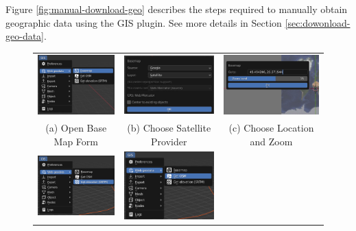 \newpage

Figure \ref{fig:manual-download-geo} describes the steps required to manually obtain geographic data using the GIS plugin. See more details in Section \ref{sec:dowonload-geo-data}.


\begin{figure}[H]
\begin{tabular}{ccc}

\includegraphics[width=42mm]{src/img/manual-download/1-get-basemap.jpg} &
\includegraphics[width=42mm]{src/img/manual-download/2-choose-sat.jpg} &
\includegraphics[width=42mm]{src/img/manual-download/3-choose-gps-zoom.jpg} \\
  (a) Open Base Map Form &  
  (b) Choose Satellite Provider &   
  (c) Choose Location and Zoom \\
  \includegraphics[width=42mm]{src/img/manual-download/4-get-alt.jpg} &
  \includegraphics[width=42mm]{src/img/manual-download/5-get-osm.jpg} &

\end{tabular}
\end{figure}
